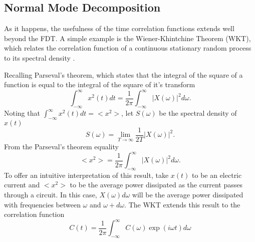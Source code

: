 \subsection{Normal Mode Decomposition}
As it happens, the usefulness of the time correlation functions extends well beyond the FDT. A simple example is the Wiener-Khintchine Theorem (WKT), which relates the correlation function of a continuous stationary random process to its spectral density \cite{mcquarrie2000statistical}.
\begin{comment}
The correlation function of a time-dependent quantity (i.e: position, velocity, etc.) is defined as the average behaviour in time of said quantity \cite{mcquarrie2000statistical}
%
\begin{equation}
C(t)=\lim_{T->\infty}\frac{1}{2T}\int_{-T}^{T}x(t+t')x(t')dt'
\end{equation}
%
From the ergodic hypothesis, as used in the Section ~\ref{}%
\begin{equation}
C(t)=<x(t+t')x(t')>.
\end{equation}
%
Let's define $X(\omega)$ as the Fourier Transform of $x(t)$
%
\begin{equation}
X(\omega)=\int_{-\infty}^{\infty}x(t)\exp{-i\omega t}dt.
\end{equation}
%
\end{comment}
Recalling Parseval's theorem, which states that the integral of the square of a function is equal to the integral of the square of it's transform
%
\begin{equation}
\int_{-\infty}^{\infty}x^2(t)dt=\frac{1}{2\pi}\int_{-\infty}^{\infty}|X(\omega)|^2d\omega.
\end{equation}
%
Noting that $\int_{-\infty}^{\infty}x^2(t)dt=<x^2>$, let $S(\omega)$ be the spectral density of $x(t)$
%
\begin{equation}
S(\omega)=\lim_{T\rightarrow\infty}\frac{1}{2T}|X(\omega)|^2.
\end{equation}
%
From the Parseval's theorem equality
%
\begin{equation}
<x^2>=\frac{1}{2\pi}\int_{-\infty}^{\infty}|X(\omega)|^2d\omega.
\end{equation}
%
To offer an intuitive interpretation of this result, take $x(t)$ to be an electric current and $<x^2>$ to be the average power dissipated as the current passes through a circuit. In this case, $X(\omega)d\omega$ will be the average power dissipated with frequencies between $\omega$ and $\omega+d\omega$. The WKT extends this result to the correlation function
%
\begin{equation}
C(t)=\frac{1}{2\pi}\int_{-\infty}^{\infty}C(\omega)\exp(i\omega t)d\omega
\end{equation}
